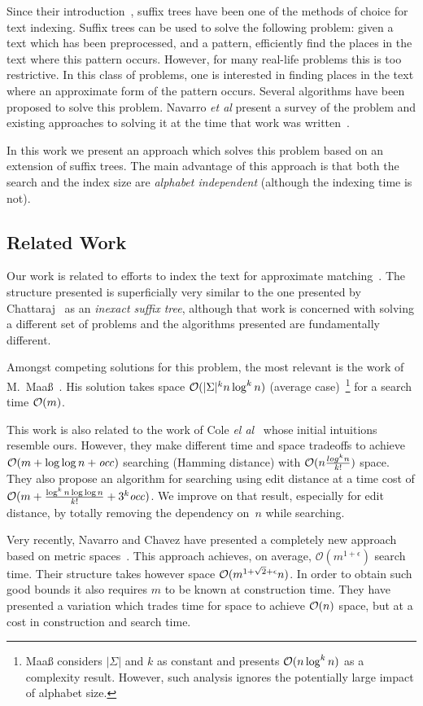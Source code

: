 Since their introduction~\cite{DBLP:conf/focs/Weiner73}, suffix trees have been one of the methods of choice for text indexing. Suffix trees can be used to solve the following problem: given a text which has been preprocessed, and a pattern, efficiently find the places in the text where this pattern occurs.  However, for many real-life problems this is too restrictive. In this class of problems, one is interested in finding places in the text where an approximate form of the pattern occurs. Several algorithms have been proposed to solve this problem. Navarro {\it et al} present a survey of the problem and existing approaches to solving it at the time that work was written~\cite{navarro:guided}.

In this work we present an approach which solves this problem based on an extension of suffix trees. The main advantage of this approach is that both the search and the index size are \emph{alphabet independent} (although the indexing time is not).

\subsection{Related Work}

Our work is related to efforts to index the text for approximate matching~\cite{maass:text,amir00oneerror}. The structure presented is superficially very similar to the one presented by Chattaraj~\cite{DBLP:journals/tcs/ChattarajP05} as an \textit{inexact suffix tree}, although that work is concerned with solving a different set of problems and the algorithms presented are fundamentally different.

Amongst competing solutions for this problem, the most relevant is the
work of M.~Maa\ss{}~\cite{maass:text}. His solution takes space
$\mathcal{O}(|\Sigma|^k n\log^k n)$ (average case)~\footnote{Maa{\ss}
considers $|\Sigma|$ and $k$ as constant and presents $\mathcal{O}(n\log^k
n)$ as a complexity result. However, such analysis ignores the
potentially large impact of alphabet size.} for a search time
$\mathcal{O}(m)$. 

This work is also related to the work of Cole {\it el
al}~\cite{cole:dictionary} whose initial intuitions resemble
ours. However, they make different time and space tradeoffs to achieve
$\mathcal{O}(m+\log\log n+\mathit{occ})$ searching (Hamming distance) with
$\mathcal{O}(n\frac{log^k n}{k!})$ space. They also propose an algorithm for
searching using edit distance at a time cost of $\mathcal{O}(m+\frac{\log^k
n \log\log n}{k!} +3^k \mathit{occ})$. We improve on that result,
especially for edit distance, by totally removing the dependency
on~$n$ while searching. 

Very recently, Navarro and Chavez have presented a completely new
approach based on metric spaces~\cite{navarro:metric}. This approach
achieves, on average, $\mathcal{O}(m^{1+\epsilon})$ search time. Their
structure takes however space $\mathcal{O}(m^{1+\sqrt{2}+\epsilon}n)$. In
order to obtain such good bounds it also requires $m$ to be known at
construction time. They have presented a variation which trades time
for space to achieve $\mathcal{O}(n)$ space, but at a cost in construction
and search time. 
